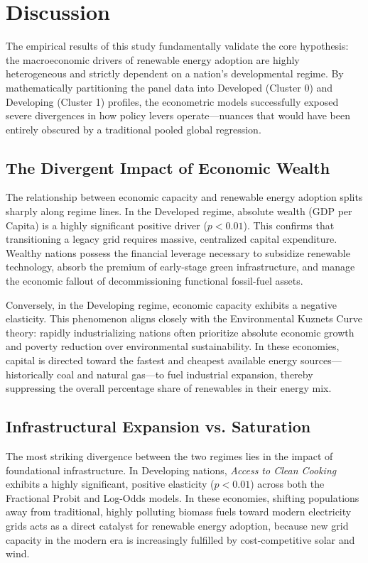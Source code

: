 \documentclass[a4paper,11pt]{article}
\begin{document}
\section{Discussion}
The empirical results of this study fundamentally validate the core hypothesis: the macroeconomic drivers of renewable energy adoption are highly heterogeneous and strictly dependent on a nation's developmental regime.
By mathematically partitioning the panel data into Developed (Cluster 0) and Developing (Cluster 1) profiles, the econometric models successfully exposed severe divergences in how policy levers operate—nuances that would have been entirely obscured by a traditional pooled global regression. 

\subsection{The Divergent Impact of Economic Wealth}
The relationship between economic capacity and renewable energy adoption splits sharply along regime lines.
In the Developed regime, absolute wealth (GDP per Capita) is a highly significant positive driver ($p < 0.01$).
This confirms that transitioning a legacy grid requires massive, centralized capital expenditure.
Wealthy nations possess the financial leverage necessary to subsidize renewable technology, absorb the premium of early-stage green infrastructure, and manage the economic fallout of decommissioning functional fossil-fuel assets. 

Conversely, in the Developing regime, economic capacity exhibits a negative elasticity.
This phenomenon aligns closely with the Environmental Kuznets Curve theory: rapidly industrializing nations often prioritize absolute economic growth and poverty reduction over environmental sustainability.
In these economies, capital is directed toward the fastest and cheapest available energy sources—historically coal and natural gas—to fuel industrial expansion, thereby suppressing the overall percentage share of renewables in their energy mix.

\subsection{Infrastructural Expansion vs. Saturation}
The most striking divergence between the two regimes lies in the impact of foundational infrastructure.
In Developing nations, \textit{Access to Clean Cooking} exhibits a highly significant, positive elasticity ($p < 0.01$) across both the Fractional Probit and Log-Odds models.
In these economies, shifting populations away from traditional, highly polluting biomass fuels toward modern electricity grids acts as a direct catalyst for renewable energy adoption, because new grid capacity in the modern era is increasingly fulfilled by cost-competitive solar and wind. 
\end{document}
